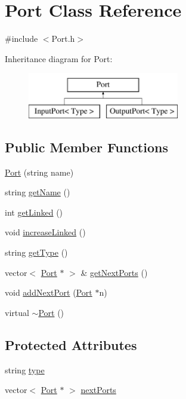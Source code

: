 \hypertarget{classPort}{\section{Port Class Reference}
\label{classPort}
}


{\ttfamily \#include $<$Port.\-h$>$}

Inheritance diagram for Port\-:\begin{figure}[H]
\begin{center}
\leavevmode
\includegraphics[height=2.000000cm]{classPort}
\end{center}
\end{figure}
\subsection*{Public Member Functions}
\begin{DoxyCompactItemize}
\item 
\hyperlink{classPort_abfb87277bc422b768ccdabd53b23fb83}{Port} (string name)
\item 
string \hyperlink{classPort_a16e393f7d744d91a7d7f8eb6bd675860}{get\-Name} ()
\item 
int \hyperlink{classPort_a8bcebf2e996d12b8bc57cbf17a44ceed}{get\-Linked} ()
\item 
void \hyperlink{classPort_ab3f05bf2221eff2c073e43c215b9507d}{increase\-Linked} ()
\item 
string \hyperlink{classPort_a9a42f2968f394a57b146e8909349c65e}{get\-Type} ()
\item 
vector$<$ \hyperlink{classPort}{Port} $\ast$ $>$ \& \hyperlink{classPort_a9004fcb7c9568ca55857ca37fc3c5c61}{get\-Next\-Ports} ()
\item 
void \hyperlink{classPort_aa78af70b4c46ed8b7a4ee127d5d46d8d}{add\-Next\-Port} (\hyperlink{classPort}{Port} $\ast$n)
\item 
virtual \hyperlink{classPort_a2a6f52a2c46c5f98a3f557707be45c54}{$\sim$\-Port} ()
\end{DoxyCompactItemize}
\subsection*{Protected Attributes}
\begin{DoxyCompactItemize}
\item 
string \hyperlink{classPort_af6073dc317b75da3997f7214e4bcc936}{type}
\item 
vector$<$ \hyperlink{classPort}{Port} $\ast$ $>$ \hyperlink{classPort_a8fc5c440becfcd3ea02cac7656097de1}{next\-Ports}
\end{DoxyCompactItemize}


